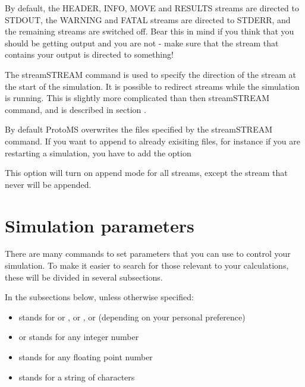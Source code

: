 \documentclass[letterpaper,10pt,english]{sphinxmanual}
\begin{document}
By default, the HEADER, INFO, MOVE and RESULTS streams are directed to STDOUT, the WARNING and FATAL streams are directed to STDERR, and the remaining streams are switched off. Bear this in mind if you think that you should be getting output and you are not - make sure that the stream that contains your output is directed to something!

The streamSTREAM command is used to specify the direction of the stream at the start of the simulation. It is possible to redirect streams while the simulation is running. This is slightly more complicated than then streamSTREAM command, and is described in section {\hyperref[\detokenize{protoms:misccmd}]{}}.

By default ProtoMS overwrites the files specified by the streamSTREAM command. If you want to append to already exisiting files, for instance if you are restarting a simulation, you have to add the option

%
\begin{sphinxVerbatim}[commandchars=\\\{\}]
 
\end{sphinxVerbatim}

This option will turn on append mode for all streams, except the  stream that never will be appended.


\section{Simulation parameters}
\label{\detokenize{protoms:simulation-parameters}}\label{\detokenize{protoms:parameters}}
There are many commands to set parameters that you can use to control your simulation. To make it easier to search for those relevant to your calculations, these will be divided in several subsections.

In the subsections below, unless otherwise specified:
\begin{itemize}
\item {} 
 stands for  or ,  or ,  or  (depending on your personal preference)

\item {} 
 or  stands for any integer number

\item {} 
 stands for any floating point number

\item {} 
 stands for a string of characters

\end{itemize}
\end{document}
